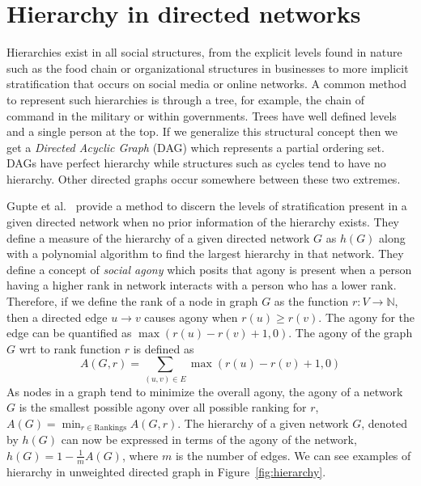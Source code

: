 \section{Hierarchy in directed networks}
\label{sec:hierarchy}
Hierarchies exist in all social structures, from the explicit levels found in nature such as the food chain or organizational structures in businesses to more implicit stratification that occurs on social media or online networks. A common method to represent such hierarchies is through a tree, for example, the chain of command in the military or within governments. Trees have well defined levels and a single person at the top. If we generalize this structural concept then we get a \textit{Directed Acyclic Graph} (DAG) which represents a partial ordering set. DAGs have perfect hierarchy while structures such as cycles tend to have no hierarchy. Other directed graphs occur somewhere between these two extremes.

Gupte et al.\ \cite{gupte2011finding} provide a method to discern the levels of stratification present in a given directed network when no prior information of the hierarchy exists. They define a measure of the hierarchy of a given directed network $G$ as $h(G)$ along with a polynomial algorithm to find the largest hierarchy in that network. They define a concept of \textit{social agony} which posits that agony is present when a person having a higher rank in network interacts with a person who has a lower rank. Therefore, if we define the rank of a node in graph $G$ as the function $r:V \rightarrow \mathbb{N}$, then a directed edge $u \rightarrow v$ causes agony when $r(u)\geq r(v)$. The agony for the edge can be quantified as $\max(r(u)-r(v)+1,0)$. The agony of the graph $G$ wrt to rank function $r$ is defined as 
\[A(G,r) =  \sum_{(u,v)\in E} \max(r(u)-r(v)+1,0)\]
As nodes in a graph tend to minimize the overall agony, the agony of a network $G$ is the smallest possible agony over all possible ranking for $r$, $A(G) = \min_{r\in \text{Rankings}}A(G,r)$. The hierarchy of a given network $G$, denoted by $h(G)$ can now be expressed in terms of the agony of the network, $h(G)=1-\frac{1}{m}A(G)$, where $m$ is the number of edges. We can see examples of hierarchy in unweighted directed graph in Figure~\ref{fig:hierarchy}.

